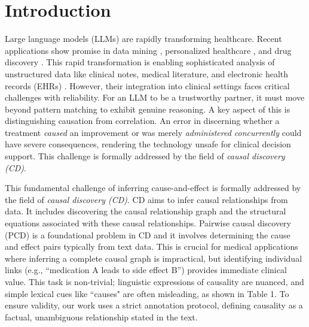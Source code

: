 \documentclass[conference]{IEEEtran}
\begin{document}
\section{Introduction}
Large language models (LLMs) are rapidly transforming healthcare. Recent applications show promise in data mining \cite{gopalakrishnan2023text}, personalized healthcare \cite{wan2025largelanguagemodelscausal, chi2024unveiling}, and drug discovery \cite{gopalakrishnan2024causality, jin2020inter}. This rapid transformation is enabling sophisticated analysis of unstructured data like clinical notes, medical literature, and electronic health records (EHRs) \cite{ma2025causalinferencelargelanguage, takayanagi2024chatgpt}. 
However, their integration into clinical settings faces critical challenges with reliability. For an LLM to be a trustworthy partner, it must move beyond pattern matching to exhibit genuine reasoning. A key aspect of this is distinguishing causation from correlation. An error in discerning whether a treatment \textit{caused} an improvement or was merely \textit{administered concurrently} could have severe consequences, rendering the technology unsafe for clinical decision support.
This challenge is formally addressed by the field of \textit{causal discovery (CD)}.


This fundamental challenge of inferring cause-and-effect is formally addressed by the field of \textit{causal discovery (CD)}. CD aims to infer causal relationships from data. It includes discovering the causal relationship graph and the structural equations associated with these causal relationships. Pairwise causal discovery (PCD) is a foundational problem in CD and it involves determining the cause and effect pairs typically from text data. This is crucial for medical applications where inferring a complete causal graph is impractical, but identifying individual links (e.g., ``medication A leads to side effect B'') provides immediate clinical value. This task is non-trivial; linguistic expressions of causality are nuanced, and simple lexical cues like ``causes" are often misleading, as shown in Table 1. To ensure validity, our work uses a strict annotation protocol, defining causality as a factual, unambiguous relationship stated in the text.
\end{document}

